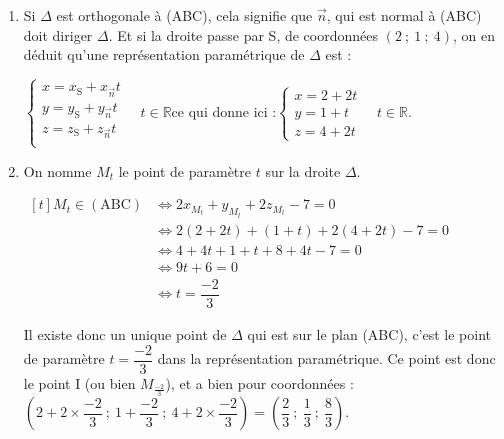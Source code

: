 \documentclass[10pt]{article}
\providecommand{\R}{\mathbb{R}}
\providecommand{\vect}[1]{\overrightarrow{#1}}
\begin{document}
\begin{enumerate}
\begin{enumerate}
	De plus, $\begin{aligned}[t] \mathrm{A} \in (\mathrm{ABC}) &\iff 2x_{\mathrm{A}} + y_{\mathrm{A}} + 2z_{\mathrm{A}} + d = 0\\
	&\iff 2\times 3 + (-1) + 2\times 1 + d = 0\\
	&\iff 6 - 1 + 2 + d = 0\\
	&\iff d = -7\end{aligned}$

	Finalement, une équation de (ABC) est :\quad$2x + y + 2z - 7 = 0$.

	\item Si $\Delta$ est orthogonale à (ABC), cela signifie que $\vect{n}$, qui est normal à (ABC) doit diriger $\Delta$. Et si la droite passe par S, de coordonnées $(2 ~;~ 1 ~;~ 4)$, on en déduit qu'une représentation paramétrique de $\Delta$ est :

	$\begin{cases}x = x_{\mathrm{S}} + x_{\vect{n}}t\\y = y_{\mathrm{S}} + y_{\vect{n}}t\\z = z_{\mathrm{S}} + z_{\vect{n}}t\\	\end{cases} \quad t \in \R$\quad ce qui donne ici :\quad $\begin{cases}x  = 2 + 2t\\y=1+t\\z=4+2t\end{cases} \quad t \in \R$.

	\item On nomme $M_t$ le point de paramètre $t$ sur la droite $\Delta$.

	$\begin{aligned}[t] M_t \in (\mathrm{ABC}) &\iff 2x_{M_{t}} + y_{M_{t}} + 2z_{M_{t}} - 7 = 0\\
	&\iff 2(2 + 2t) + (1 + t) + 2(4 + 2t) - 7 = 0\\
	&\iff 4 + 4t + 1 + t + 8 + 4t - 7 = 0\\
	&\iff 9t + 6 = 0\\
	&\iff t = \dfrac{-2}{3}\end{aligned}$

	Il existe donc un unique point de $\Delta$ qui est sur le plan (ABC), c'est le point de paramètre $t=\dfrac{-2}{3}$ dans la représentation paramétrique. Ce point est donc le point I (ou bien $M_{\frac{-2}{3}}$), et a bien pour coordonnées : $\left(2 + 2\times \dfrac{-2}{3} ~;~ 1 + \dfrac{-2}{3}~;~ 4 + 2\times \dfrac{-2}{3}\right)  = \left(\dfrac{2}{3} ~;~ \dfrac{1}{3} ~;~ \dfrac{8}{3}\right)$.


\end{enumerate}
\end{enumerate}
\end{document}
